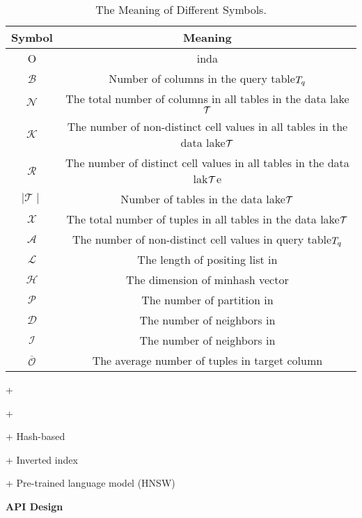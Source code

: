 \begin{table*}[!ht]
	\centering
	\caption{The Meaning of Different Symbols.}
	\begin{tabular}{cc}
		\hline
		Symbol & Meaning \\ \hline
		O & inda \\ 
		$\mathcal{B}$ & Number of columns in the query table$T_q$  \\
		$\mathcal{N}$ &The total number of columns in all tables in the data lake$\mathcal{T}$ \\
		$\mathcal{K}$ & The number of non-distinct cell values in all tables in the data lake$\mathcal{T}$   \\
		$\mathcal{R}$ &The number of distinct cell values in all tables in the data lak$\mathcal{T}$e \\
		$\mid \mathcal{T} \mid$ & Number of tables in the data lake$\mathcal{T}$  \\
		$\mathcal{X}$ &The total number of tuples in all tables in the data lake$\mathcal{T}$ \\
		$\mathcal{A}$ & The number of non-distinct cell values in query table$T_q$  \\
		
		$\mathcal{L}$ & The length of positing list in \josie  \\
		$\mathcal{H}$ & The dimension of minhash vector \\
		$\mathcal{P}$ & The number of partition in \lsh\\
		$\mathcal{D}$ & The number of neighbors in \dlll\\
		$\mathcal{I}$ & The number of neighbors in \infogather\\
		$\overline{\mathcal{O}}$ & The average number of tuples in target column\\





	
	\end{tabular}
	\label{symbol_table}
\end{table*}

+ 

+ 

+ Hash-based

+ Inverted index 

+ Pre-trained language model (HNSW)


\noindent\textbf{API Design}

